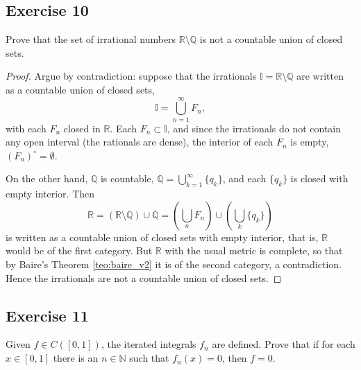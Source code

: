 \documentclass[11pt, a4paper]{article}
\begin{document}
\subsection*{Exercise 10}

Prove that the set of irrational numbers $\mathbb{R} \setminus \mathbb{Q}$ is not a countable
union of closed sets.

\begin{proof}
Argue by contradiction: suppose that the irrationals $\mathbb{I} = \mathbb{R} \setminus \mathbb{Q}$
are written as a countable union of closed sets,
$$ \mathbb{I} = \bigcup_{n=1}^{\infty} F_n, $$
with each $F_n$ closed in $\mathbb{R}$. Each $F_n \subset \mathbb{I}$, and since the irrationals do not
contain any open interval (the rationals are dense), the interior of each $F_n$ is empty,
$(F_n)^\circ = \emptyset$.

On the other hand, $\mathbb{Q}$ is countable, $\mathbb{Q} = \bigcup_{k=1}^{\infty} \{q_k\}$, and each
$\{q_k\}$ is closed with empty interior. Then
$$ \mathbb{R} = (\mathbb{R} \setminus \mathbb{Q}) \cup \mathbb{Q}
= \left( \bigcup_{n} F_n \right) \cup \left( \bigcup_{k} \{q_k\} \right) $$
is written as a countable union of closed sets with empty interior, that is, $\mathbb{R}$ would be of the
first category. But $\mathbb{R}$ with the usual metric is complete, so that by Baire's
Theorem \ref{teo:baire_v2} it is of the second category, a contradiction. Hence the irrationals are not a countable
union of closed sets.
\end{proof}

\subsection*{Exercise 11}

Given $f \in C([0,1])$, the iterated integrals $f_n$ are defined. Prove that if for each
$x \in [0,1]$ there is an $n \in \mathbb{N}$ such that $f_n(x)=0$, then $f=0$.
\end{document}
